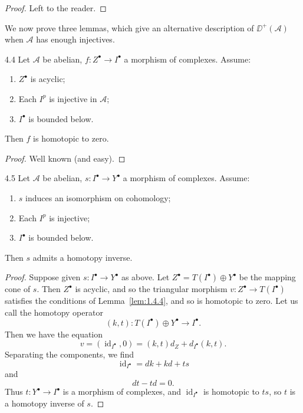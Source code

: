 \begin{proof}
Left to the reader.
\end{proof}

We now prove three lemmas, which give an alternative description of $\DD^+(\mathcal{A})$ when $\mathcal{A}$ has enough injectives.

\begin{booklemma}{4.4}\label{lem:1.4.4}
Let $\mathcal{A}$ be abelian, $f\colon Z^\bullet\to I^\bullet$ a morphism of complexes. Assume:
\begin{enumerate}
\item[(1)] $Z^\bullet$ is acyclic;
\item[(2)] Each $I^p$ is injective in $\mathcal{A}$;
\item[(3)] $I^\bullet$ is bounded below.
\end{enumerate}
Then $f$ is homotopic to zero.
\end{booklemma}
\begin{proof}
	Well known (and easy).
\end{proof}
\begin{booklemma}{4.5}\label{lem:1.4.5}
Let $\mathcal{A}$ be abelian, $s\colon I^\bullet\to Y^\bullet$ a morphism of complexes. Assume:
\begin{enumerate}
\item[(1)] $s$ induces an isomorphism on cohomology;
\item[(2)] Each $I^p$ is injective;
\item[(3)] $I^\bullet$ is bounded below.
\end{enumerate}
Then $s$ admits a homotopy inverse.
\end{booklemma}

\begin{proof}
Suppose given $s\colon I^\bullet\to Y^\bullet$ as above. Let $Z^\bullet = T(I^\bullet)\oplus Y^\bullet$ be the mapping cone of $s$. Then $Z^\bullet$ is acyclic, and so the triangular morphism $v\colon Z^\bullet\to T(I^\bullet)$ satisfies the conditions of Lemma~\ref{lem:1.4.4}, and so is homotopic to zero. Let us call the homotopy operator
\[
(k,t)\colon T(I^\bullet)\oplus Y^\bullet \longrightarrow I^\bullet.
\]
Then we have the equation
\[
v = (\operatorname{id}_{I^\bullet},0) = (k,t)d_Z + d_{I^\bullet}(k,t).
\]
Separating the components, we find
\[
\operatorname{id}_{I^\bullet} = dk + kd + ts
\]
and
\[
dt - td = 0.
\]
Thus $t\colon Y^\bullet\to I^\bullet$ is a morphism of complexes, and $\operatorname{id}_{I^\bullet}$ is homotopic to $ts$, so $t$ is a homotopy inverse of $s$.
\end{proof}

